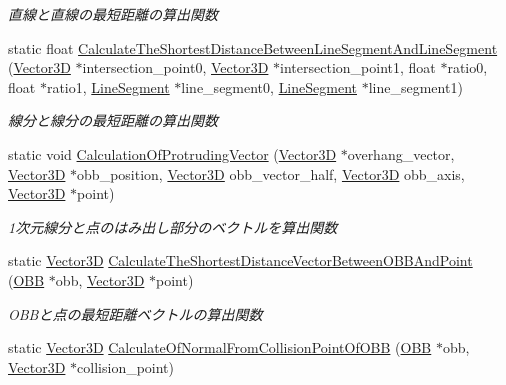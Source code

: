 \begin{DoxyCompactItemize}
\begin{DoxyCompactList}\small\item\em 直線と直線の最短距離の算出関数 \end{DoxyCompactList}\item 
static float \mbox{\hyperlink{class_collision_calculation_a9a3f886697f5e0092cf8f5d7dc17c716}{Calculate\+The\+Shortest\+Distance\+Between\+Line\+Segment\+And\+Line\+Segment}} (\mbox{\hyperlink{class_vector3_d}{Vector3D}} $\ast$intersection\+\_\+point0, \mbox{\hyperlink{class_vector3_d}{Vector3D}} $\ast$intersection\+\_\+point1, float $\ast$ratio0, float $\ast$ratio1, \mbox{\hyperlink{class_line_segment}{Line\+Segment}} $\ast$line\+\_\+segment0, \mbox{\hyperlink{class_line_segment}{Line\+Segment}} $\ast$line\+\_\+segment1)
\begin{DoxyCompactList}\small\item\em 線分と線分の最短距離の算出関数 \end{DoxyCompactList}\item 
static void \mbox{\hyperlink{class_collision_calculation_ac54577d2cc58662abf57c2ae48688a44}{Calculation\+Of\+Protruding\+Vector}} (\mbox{\hyperlink{class_vector3_d}{Vector3D}} $\ast$overhang\+\_\+vector, \mbox{\hyperlink{class_vector3_d}{Vector3D}} $\ast$obb\+\_\+position, \mbox{\hyperlink{class_vector3_d}{Vector3D}} obb\+\_\+vector\+\_\+half, \mbox{\hyperlink{class_vector3_d}{Vector3D}} obb\+\_\+axis, \mbox{\hyperlink{class_vector3_d}{Vector3D}} $\ast$point)
\begin{DoxyCompactList}\small\item\em 1次元線分と点のはみ出し部分のベクトルを算出関数 \end{DoxyCompactList}\item 
static \mbox{\hyperlink{class_vector3_d}{Vector3D}} \mbox{\hyperlink{class_collision_calculation_ac35137f15a3d1a43e3db08048c17d445}{Calculate\+The\+Shortest\+Distance\+Vector\+Between\+O\+B\+B\+And\+Point}} (\mbox{\hyperlink{class_o_b_b}{O\+BB}} $\ast$obb, \mbox{\hyperlink{class_vector3_d}{Vector3D}} $\ast$point)
\begin{DoxyCompactList}\small\item\em O\+B\+Bと点の最短距離ベクトルの算出関数 \end{DoxyCompactList}\item 
static \mbox{\hyperlink{class_vector3_d}{Vector3D}} \mbox{\hyperlink{class_collision_calculation_abfab700f04f8c5bb2a71fe560ca6c66e}{Calculate\+Of\+Normal\+From\+Collision\+Point\+Of\+O\+BB}} (\mbox{\hyperlink{class_o_b_b}{O\+BB}} $\ast$obb, \mbox{\hyperlink{class_vector3_d}{Vector3D}} $\ast$collision\+\_\+point)

\end{DoxyCompactItemize}
